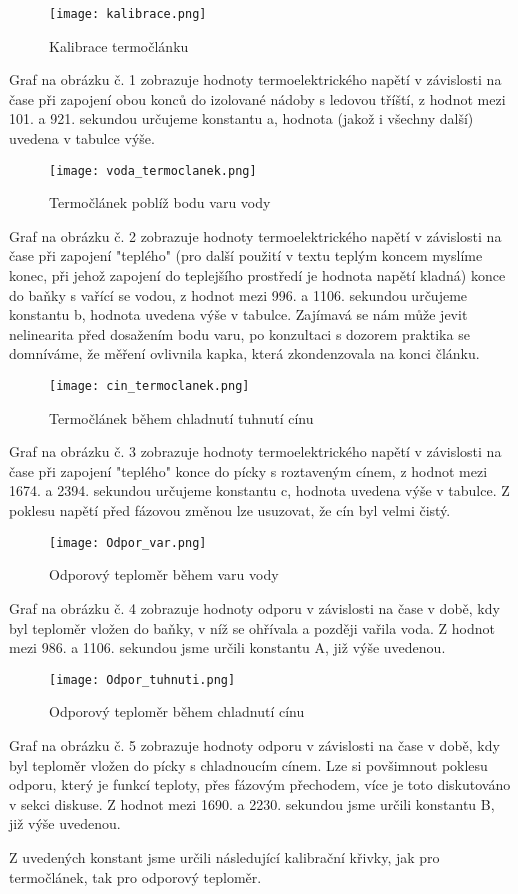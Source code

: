 \documentclass{article}
\begin{document}
\begin{figure}[H]
\centering
\caption{Kalibrace termočlánku}
\texttt{[image: kalibrace.png]}
\end{figure}
\par Graf na obrázku č. 1 zobrazuje hodnoty termoelektrického napětí v závislosti na čase při zapojení obou konců do izolované nádoby s ledovou tříští, z hodnot mezi 101. a 921. sekundou určujeme konstantu a, hodnota (jakož i všechny další) uvedena v tabulce výše.
\begin{figure}[H]
\centering
\caption{Termočlánek poblíž bodu varu vody}
\texttt{[image: voda\_termoclanek.png]}
\end{figure}
\par Graf na obrázku č. 2 zobrazuje hodnoty termoelektrického napětí v závislosti na čase při zapojení "teplého" (pro další použití v textu teplým koncem myslíme konec, při jehož zapojení do teplejšího prostředí je hodnota napětí kladná) konce do baňky s vařící se vodou, z hodnot mezi 996. a 1106. sekundou určujeme konstantu b, hodnota uvedena výše v tabulce. Zajímavá se nám může jevit nelinearita před dosažením bodu varu, po konzultaci s dozorem praktika se domníváme, že měření ovlivnila kapka, která zkondenzovala na konci článku.
\begin{figure}[H]
\centering
\caption{Termočlánek během chladnutí tuhnutí cínu}
\texttt{[image: cin\_termoclanek.png]}
\end{figure}
\par Graf na obrázku č. 3 zobrazuje hodnoty termoelektrického napětí v závislosti na čase při zapojení  "teplého" konce do pícky s roztaveným cínem, z hodnot mezi 1674. a 2394. sekundou určujeme konstantu c, hodnota uvedena výše v tabulce. Z poklesu napětí před fázovou změnou lze usuzovat, že cín byl velmi čistý.
\begin{figure}[H]
\centering
\caption{Odporový teploměr během varu vody}
\texttt{[image: Odpor\_var.png]}
\end{figure}
\par Graf na obrázku č. 4 zobrazuje hodnoty odporu v závislosti na čase v době, kdy byl teploměr vložen do baňky, v níž se ohřívala a později vařila voda. Z hodnot mezi 986. a 1106. sekundou jsme určili konstantu A, již výše uvedenou.
\begin{figure}[H]
\centering
\caption{Odporový teploměr během chladnutí cínu}
\texttt{[image: Odpor\_tuhnuti.png]}
\end{figure}
\par Graf na obrázku č. 5 zobrazuje hodnoty odporu v závislosti na čase v době, kdy byl teploměr vložen do pícky s chladnoucím cínem. Lze si povšimnout poklesu odporu, který je funkcí teploty, přes fázovým přechodem, více je toto diskutováno v sekci diskuse. Z hodnot mezi 1690. a 2230. sekundou jsme určili konstantu B, již výše uvedenou.
\par Z uvedených konstant jsme určili následující kalibrační křivky, jak pro termočlánek, tak pro odporový teploměr.
\end{document}
